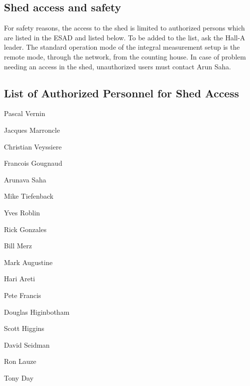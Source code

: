 \subsection{Shed access and safety }

For safety reasons, the access to the shed is limited to authorized
persons which are listed in the ESAD and listed below. To be added to the list, 
ask the 
Hall-A leader. 
The standard
operation mode of the integral measurement setup is the remote mode, through
the network, from the counting house. In case of problem needing an access in
the shed, unauthorized users must contact Arun Saha.

\subsection{List of Authorized Personnel for Shed Access}


Pascal Vernin

Jacques Marroncle

Christian Veyssiere

Francois Gougnaud

Arunava Saha

Mike Tiefenback

Yves Roblin

Rick Gonzales

Bill Merz

Mark Augustine

Hari Areti

Pete Francis

Douglas Higinbotham

Scott Higgins

David Seidman

Ron Lauze

Tony Day


%
%
%
%

